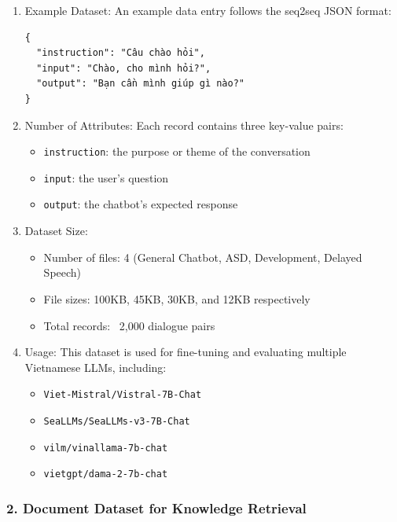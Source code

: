 \documentclass[runningheads]{llncs}
\begin{document}
\begin{enumerate}[label=(\alph*)]
\item Example Dataset: 
An example data entry follows the seq2seq JSON format:

\begin{verbatim}
{
  "instruction": "Câu chào hỏi",
  "input": "Chào, cho mình hỏi?",
  "output": "Bạn cần mình giúp gì nào?"
}
\end{verbatim}

\item Number of Attributes: 
Each record contains three key-value pairs:
\begin{itemize}
    \item \texttt{instruction}: the purpose or theme of the conversation
    \item \texttt{input}: the user's question
    \item \texttt{output}: the chatbot's expected response
\end{itemize}

\item Dataset Size: 
\begin{itemize}
    \item Number of files: 4 (General Chatbot, ASD, Development, Delayed Speech)
    \item File sizes: 100KB, 45KB, 30KB, and 12KB respectively
    \item Total records: ~2,000 dialogue pairs
\end{itemize}

\item Usage: 
This dataset is used for fine-tuning and evaluating multiple Vietnamese LLMs, including:
\begin{itemize}
    \item \texttt{Viet-Mistral/Vistral-7B-Chat}
    \item \texttt{SeaLLMs/SeaLLMs-v3-7B-Chat}
    \item \texttt{vilm/vinallama-7b-chat}
    \item \texttt{vietgpt/dama-2-7b-chat}
\end{itemize}
\end{enumerate}
\subsubsection*{2. Document Dataset for Knowledge Retrieval}
\end{document}
